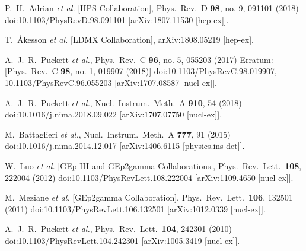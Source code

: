 \documentclass[11pt]{article}
\begin{document}
    \begin{thebibliography}{99}

            P.~H.~Adrian {\it et al.} [HPS Collaboration],
            Phys.\ Rev.\ D {\bf 98}, no. 9, 091101 (2018)
            doi:10.1103/PhysRevD.98.091101
            [arXiv:1807.11530 [hep-ex]].
        
            T.~Åkesson {\it et al.} [LDMX Collaboration],
            arXiv:1808.05219 [hep-ex].

  A.~J.~R.~Puckett {\it et al.},
  Phys.\ Rev.\ C {\bf 96}, no. 5, 055203 (2017)
  Erratum: [Phys.\ Rev.\ C {\bf 98}, no. 1, 019907 (2018)]
  doi:10.1103/PhysRevC.98.019907, 10.1103/PhysRevC.96.055203
  [arXiv:1707.08587 [nucl-ex]].

  A.~J.~R.~Puckett {\it et al.},
  Nucl.\ Instrum.\ Meth.\ A {\bf 910}, 54 (2018)
  doi:10.1016/j.nima.2018.09.022
  [arXiv:1707.07750 [nucl-ex]].

  M.~Battaglieri {\it et al.},
  Nucl.\ Instrum.\ Meth.\ A {\bf 777}, 91 (2015)
  doi:10.1016/j.nima.2014.12.017
  [arXiv:1406.6115 [physics.ins-det]].

  W.~Luo {\it et al.} [GEp-III and GEp2gamma Collaborations],
  Phys.\ Rev.\ Lett.\  {\bf 108}, 222004 (2012)
  doi:10.1103/PhysRevLett.108.222004
  [arXiv:1109.4650 [nucl-ex]].

  M.~Meziane {\it et al.} [GEp2gamma Collaboration],
  Phys.\ Rev.\ Lett.\  {\bf 106}, 132501 (2011)
  doi:10.1103/PhysRevLett.106.132501
  [arXiv:1012.0339 [nucl-ex]].

  A.~J.~R.~Puckett {\it et al.},
  Phys.\ Rev.\ Lett.\  {\bf 104}, 242301 (2010)
  doi:10.1103/PhysRevLett.104.242301
  [arXiv:1005.3419 [nucl-ex]].

    \end{thebibliography}
    \nocite{*}
\end{document}

